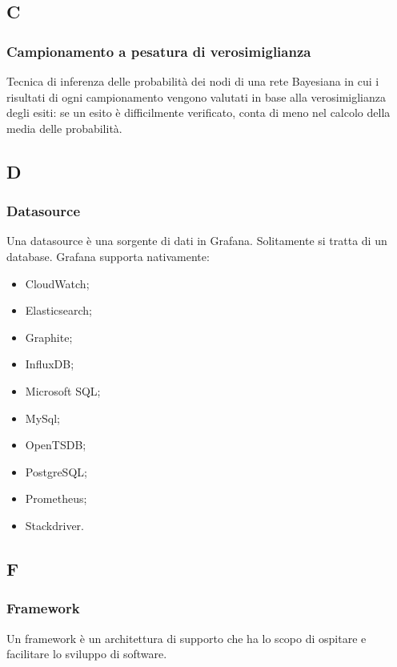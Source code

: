 \appendix
{}
\subsection*{C}
\subsubsection*{Campionamento a pesatura di verosimiglianza}
\label{sec:campionamento}
Tecnica di inferenza delle probabilità dei nodi di una rete Bayesiana in cui i risultati di ogni campionamento vengono valutati in base alla verosimiglianza degli esiti: se un esito è difficilmente verificato, conta di meno nel calcolo della media delle probabilità.

\subsection*{D}

\subsubsection*{Datasource}
\label{sec:datasource} 
Una datasource è una sorgente di dati in Grafana. Solitamente si tratta di un database. Grafana supporta nativamente:
	\begin{itemize}
	\item CloudWatch;
	\item Elasticsearch;
	\item Graphite;
	\item InfluxDB;
	\item Microsoft SQL;
	\item MySql;
	\item OpenTSDB;
	\item PostgreSQL;
	\item Prometheus;
	\item Stackdriver.
	\end{itemize}


\subsection*{F}

	\subsubsection*{Framework} 
	\label{sec:ide}
Un framework è un architettura di supporto che ha lo scopo di ospitare e facilitare lo sviluppo di software.


